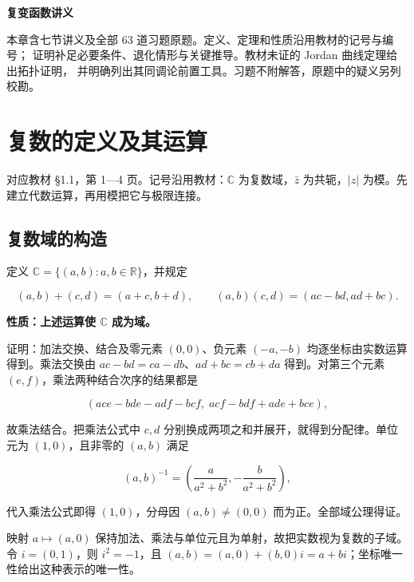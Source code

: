 \documentclass[11pt,a4paper]{article}
\begin{document}
\begin{center}
{\LARGE\bfseries 复变函数讲义\par}
\vspace{8pt}{\large 第一章\quad 复数与复变函数\par}
\vspace{6pt}{\small 依史济怀、刘太顺《复变函数》\quad 教材第 1—26 页\par}
\end{center}
\vspace{8pt}
本章含七节讲义及全部 63 道习题原题。定义、定理和性质沿用教材的记号与编号；
证明补足必要条件、退化情形与关键推导。教材未证的 Jordan 曲线定理给出拓扑证明，
并明确列出其同调论前置工具。习题不附解答，原题中的疑义另列校勘。
\tableofcontents
\clearpage
\section{复数的定义及其运算}
对应教材 §1.1，第 1---4 页。记号沿用教材：\(\mathbb C\)
为复数域，\(\bar z\) 为共轭，\(|z|\)
为模。先建立代数运算，再用模把它与极限连接。

\subsection{复数域的构造}\label{ux590dux6570ux57dfux7684ux6784ux9020}

定义 \(\mathbb C=\{(a,b):a,b\in\mathbb R\}\)，并规定

\[
(a,b)+(c,d)=(a+c,b+d),\qquad
(a,b)(c,d)=(ac-bd,ad+bc).
\]

\textbf{性质：上述运算使 \(\mathbb C\) 成为域。}

证明：加法交换、结合及零元素 \((0,0)\)、负元素 \((-a,-b)\)
均逐坐标由实数运算得到。乘法交换由 \(ac-bd=ca-db\)、\(ad+bc=cb+da\)
得到。对第三个元素 \((e,f)\)，乘法两种结合次序的结果都是

\[
(ace-bde-adf-bcf,\;acf-bdf+ade+bce),
\]

故乘法结合。把乘法公式中 \(c,d\)
分别换成两项之和并展开，就得到分配律。单位元为 \((1,0)\)，且非零的
\((a,b)\) 满足

\[
(a,b)^{-1}=\left(\frac a{a^2+b^2},-\frac b{a^2+b^2}\right),
\]

代入乘法公式即得 \((1,0)\)，分母因 \((a,b)\ne(0,0)\)
而为正。全部域公理得证。

映射 \(a\mapsto(a,0)\)
保持加法、乘法与单位元且为单射，故把实数视为复数的子域。令
\(i=(0,1)\)，则 \(i^2=-1\)，且
\((a,b)=(a,0)+(b,0)i=a+bi\)；坐标唯一性给出这种表示的唯一性。
\end{document}
